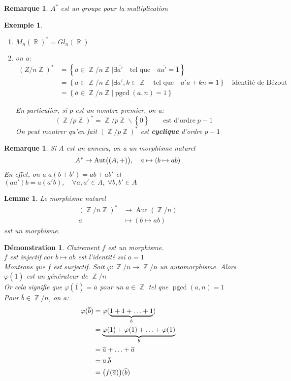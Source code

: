 \documentclass[a4paper, oneside]{report}
\theoremstyle{break}
\newtheorem{lemme}[thm]{Lemme}
\newtheorem{exemple}[thm]{Exemple}
\newtheorem{remarque}[thm]{Remarque}
\newtheorem*{demonstration}{Démonstration}
\DeclareMathOperator{\R}{\mathbb{R}}
\DeclareMathOperator{\Z}{\mathbb{Z}}
\DeclarePairedDelimiter\ens{\left\{ }{\right\} }%
\DeclarePairedDelimiter\pa{\big(}{\big)}%
\DeclareMathOperator{\pgcd}{pgcd}
\DeclareMathOperator{\Aut}{Aut}
\renewcommand{\ens}[1]{\left\{ #1 \right\} }%
\newcommand{\slign}{\textbf}
\newcommand{\ol}{\overline}
\newcommand{\ub}{\underbrace}
\newcommand{\Ens}{\ens}
\begin{document}
\begin{remarque}
$A^*$ est un groupe pour la multiplication
\end{remarque}

\begin{exemple}
\begin{enumerate}
\item  $M_n(\R)^* = Gl_n(\R)$

\medbreak

\item  on a:
\begin{align*}
(Z/n\Z)^* &= \Ens{\ol{a} \in \Z/n\Z \big| \exists \ol{a'}	\quad	\text{tel que}	\quad	\ol{a}\ol{a'} = \ol{1}}
\\
&= \Ens{\ol{a} \in \Z/n\Z \big| \exists a', k \in \Z		\quad	\text{tel que}		\quad	a'a+kn = 1}	\quad	\text{identité de Bézout}
\\
&= \Ens{\ol{a} \in \Z/n\Z \big| \pgcd(a,n) = 1}
\end{align*}

En particulier, si $p$ est un nombre premier, on a:
\[
(\Z/p\Z)^* = \Z/p\Z \backslash \ens{\ol{0}}	\qquad	\text{est d'ordre} \; p - 1
\]
On peut montrer qu'en fait $(\Z/p\Z)^*$ est \slign{cyclique} d'ordre $p - 1$
\end{enumerate}
\end{exemple}

\begin{remarque}
Si $A$ est un anneau, on a un morphisme naturel
\[
A^* \rightarrow \Aut\pa{(A, +)}, 	\quad	a \mapsto (b \mapsto ab)
\]
En effet, on a $a(b+b') = ab + ab'$ et $(aa') b = a(a'b),	\quad	\forall a, a' \in A, \; \forall b, b' \in A$
\end{remarque}

\begin{lemme}
Le morphisme naturel
\begin{align*}
(\Z/n\Z)^* &\rightarrow \Aut(\Z/n)
\\
a &\mapsto (b \mapsto ab)
\end{align*}
est un morphisme.
\end{lemme}

\begin{demonstration}
Clairement $f$ est un morphisme.\\
$f$ est injectif car $b \mapsto ab$ est l'identité ssi $a = 1$\\
Montrons que $f$ est surjectif. Soit $\varphi : \Z/n \rightarrow \Z/n$ un automorphisme. Alors $\varphi(\ol{1})$ est un générateur de $\Z/n$\\
Or cela signifie que $\varphi(\ol{1}) = \ol{a}$ pour un $a \in \Z$ tel que $\pgcd(a, n) = 1$\\
Pour $\ol{b} \in \Z/n$, on a:
\begin{align*}
\varphi(\ol{b}) &= \varphi(\ub{1 + 1 + \ldots + 1}_{b}) 
\\
&= \ub{\varphi(1) + \varphi(1) + \ldots + \varphi(1)}_{b} 
\\
&= \ol{a} + \ldots + \ol{a} 
\\
&= \ol{a} . \ol{b}
\\
&= \pa{f(\ol{a})}(\ol{b})
\end{align*}
~
\end{demonstration}
\end{document}
